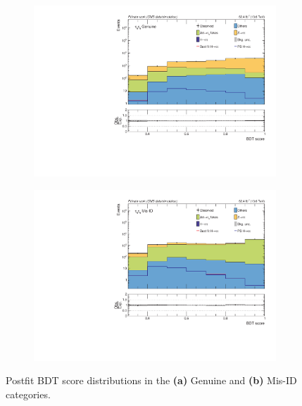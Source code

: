 \begin{figure}[!htbp]
        \centering
        \begin{subfigure}[b]{0.7\textwidth}
            \centering
            \includegraphics[width=\textwidth]{Figures/Chapter7/postfit/htt_tt_1_13p6TeV.pdf}
            \caption{}
        \end{subfigure}
        \begin{subfigure}[b]{0.7\textwidth}
            \centering
            \includegraphics[width=\textwidth]{Figures/Chapter7/postfit/htt_tt_2_13p6TeV.pdf}
            \caption{}
        \end{subfigure}
    \caption{Postfit BDT score distributions in the \textbf{(a)} Genuine and \textbf{(b)} Mis-ID categories.}
    \label{Figure:Chapter7_Postfit_BDT}
\end{figure}

